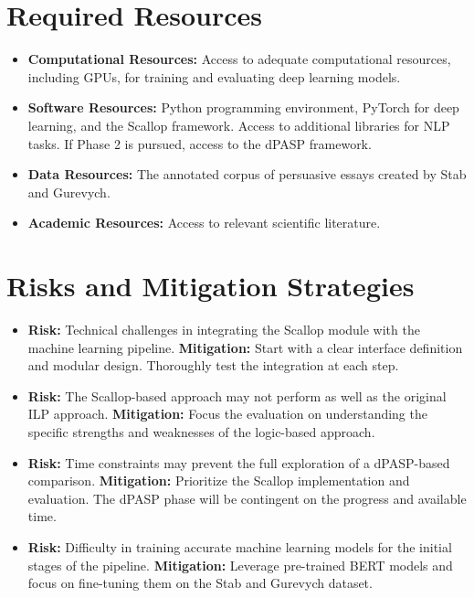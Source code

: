 \documentclass{article}
\begin{document}
\section{Required Resources}

\begin{itemize}
    \item \textbf{Computational Resources:} Access to adequate computational
    resources, including GPUs, for training and evaluating deep learning models.

    \item \textbf{Software Resources:} Python programming environment, PyTorch
    for deep learning, and the Scallop framework. Access to additional
    libraries for NLP tasks. If Phase 2 is pursued, access to the dPASP
    framework.

    \item \textbf{Data Resources:} The annotated corpus of persuasive essays
    created by Stab and Gurevych.

    \item \textbf{Academic Resources:} Access to relevant scientific literature.
\end{itemize}

\section{Risks and Mitigation Strategies}

\begin{itemize}
    \item \textbf{Risk:} Technical challenges in integrating the Scallop module
    with the machine learning pipeline.
    \textbf{Mitigation:} Start with a clear interface definition and modular
    design. Thoroughly test the integration at each step.

    \item \textbf{Risk:} The Scallop-based approach may not perform as well as
    the original ILP approach.
    \textbf{Mitigation:} Focus the evaluation on understanding the specific
    strengths and weaknesses of the logic-based approach.

    \item \textbf{Risk:} Time constraints may prevent the full exploration of a
    dPASP-based comparison.
    \textbf{Mitigation:} Prioritize the Scallop implementation and evaluation.
    The dPASP phase will be contingent on the progress and available time.

    \item \textbf{Risk:} Difficulty in training accurate machine learning
    models for the initial stages of the pipeline.
    \textbf{Mitigation:} Leverage pre-trained BERT models and focus on fine-tuning
    them on the Stab and Gurevych dataset.
\end{itemize}
\end{document}
